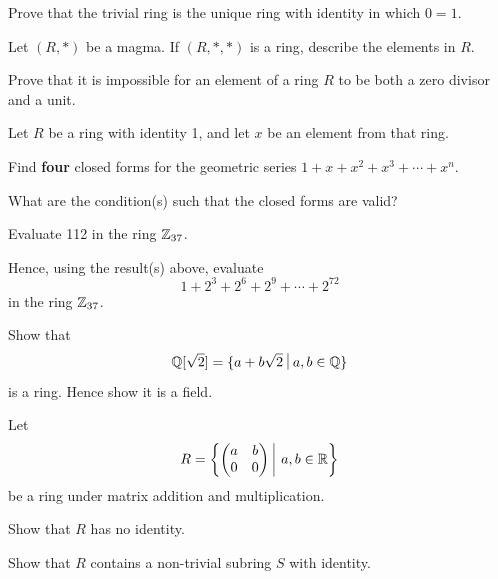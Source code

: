 \begin{problem}
    Prove that the trivial ring is the unique ring with identity in which $0 = 1$.
\end{problem}

\begin{problem}
    Let $(R, \ast)$ be a magma. If $(R, \ast, \ast)$ is a ring, describe the elements in $R$.
\end{problem}

\begin{problem}
    Prove that it is impossible for an element of a ring $R$ to be both a zero divisor and a unit.
\end{problem}

\begin{problem}
    Let $R$ be a ring with identity 1, and let $x$ be an element from that ring.
    \begin{partquestions}{\roman*}
        \item Find \textbf{four} closed forms for the geometric series $1 + x + x^2 + x^3 + \cdots + x^n$.
        \item What are the condition(s) such that the closed forms are valid?
        \item Evaluate 112 in the ring $\mathbb{Z}_{37}$.
        \item Hence, using the result(s) above, evaluate
        \[
            1 + 2^3 + 2^6 + 2^9 + \cdots + 2^{72}
        \]
        in the ring $\mathbb{Z}_{37}$.
    \end{partquestions}
\end{problem}

\begin{problem}
    Show that
    \[
        \Q[\sqrt2] = \{a + b\sqrt2 \vert a,b \in \Q\}
    \]
    is a ring. Hence show it is a field.
\end{problem}

\newpage

\begin{problem}
    Let
    \[
        R = \left\{\begin{pmatrix}a&b\\0&0\end{pmatrix} \vert a,b \in \R\right\}    
    \]
    be a ring under matrix addition and multiplication.
    \begin{partquestions}{\roman*}
        \item Show that $R$ has no identity.
        \item Show that $R$ contains a non-trivial subring $S$ with identity.
    \end{partquestions}
\end{problem}

